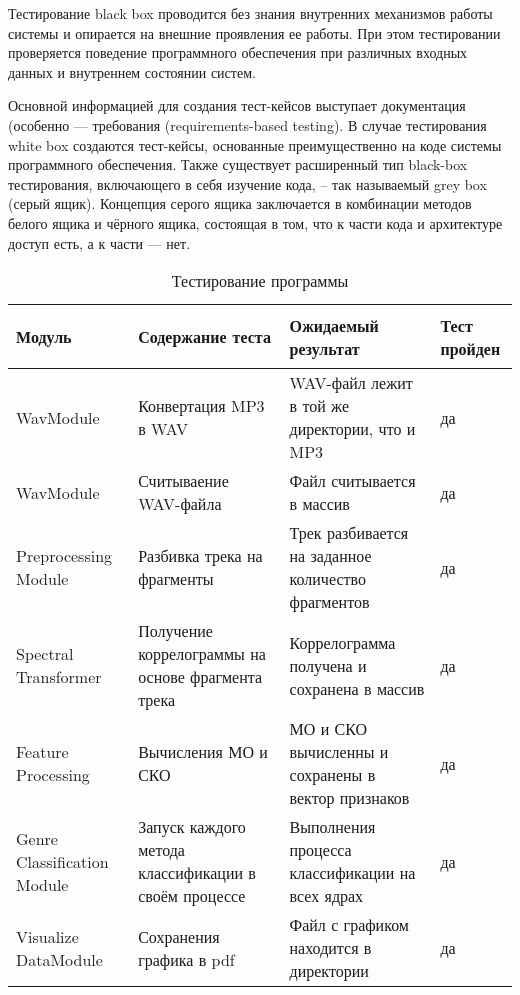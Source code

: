 Тестирование black box проводится без знания внутренних механизмов работы системы и опирается на внешние проявления ее работы. При этом тестировании проверяется поведение программного обеспечения при различных входных данных и внутреннем состоянии систем. 

Основной информацией для создания тест-кейсов выступает документация (особенно — требования (requirements-based testing). В случае тестирования white box создаются тест-кейсы, основанные преимущественно на коде системы программного обеспечения. Также существует расширенный тип black-box тестирования, включающего в себя изучение кода, – так называемый grey box (серый ящик). Концепция серого ящика заключается в комбинации методов белого ящика и чёрного ящика, состоящая в том, что к части кода и архитектуре доступ есть, а к части — нет.

\begin{table}[t!]
\caption{Тестирование программы}
\label{table:manual:testing}
  \centering
  \begin{tabular}{| >{\raggedright}m{}
                  | >{\centering}m{}
                  | >{\centering}m{}
                  | >{\centering\arraybackslash}m{}|}
    \hline
    {\begin{center}
    Модуль
    \end{center} } & Содержание теста & Ожидаемый результат & Тест пройден \\
    \hline
    WavModule & Конвертация MP3 в WAV & WAV-файл лежит в той же директории, что и MP3  & да \\

    \hline
    WavModule & Считываение WAV-файла & Файл считывается в массив & да \\

    \hline
    Preprocessing Module & Разбивка трека на фрагменты & Трек разбивается на заданное количество фрагментов & да \\

    \hline
    Spectral Transformer &  Получение коррелограммы на основе фрагмента трека & Коррелограмма получена и сохранена в массив  & да \\

    \hline
    Feature Processing &  Вычисления МО и СКО  &  МО и СКО вычисленны и сохранены в вектор признаков & да \\

    \hline
    Genre Classification Module & Запуск каждого метода классификации в своём процессе & Выполнения процесса классификации на всех ядрах & да \\

    \hline
    Visualize DataModule & Сохранения графика в pdf & Файл с графиком находится в директории & да \\

    \hline

  \end{tabular}
\end{table}

